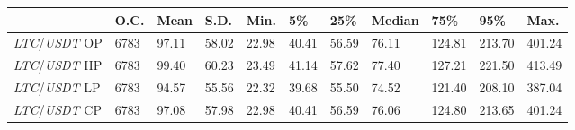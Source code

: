 \begin{tabular}{lllllllllll}
\toprule
 & \textbf{O.C.} & \textbf{Mean} & \textbf{S.D.} & \textbf{Min.} & \textbf{5\%} & \textbf{25\%} & \textbf{Median} & \textbf{75\%} & \textbf{95\%} & \textbf{Max.} \\
\midrule
\emph{LTC}/\emph{USDT} OP & 6783 & 97.11 & 58.02 & 22.98 & 40.41 & 56.59 & 76.11 & 124.81 & 213.70 & 401.24 \\
\emph{LTC}/\emph{USDT} HP & 6783 & 99.40 & 60.23 & 23.49 & 41.14 & 57.62 & 77.40 & 127.21 & 221.50 & 413.49 \\
\emph{LTC}/\emph{USDT} LP & 6783 & 94.57 & 55.56 & 22.32 & 39.68 & 55.50 & 74.52 & 121.40 & 208.10 & 387.04 \\
\emph{LTC}/\emph{USDT} CP & 6783 & 97.08 & 57.98 & 22.98 & 40.41 & 56.59 & 76.06 & 124.80 & 213.65 & 401.24 \\
\bottomrule
\end{tabular}
